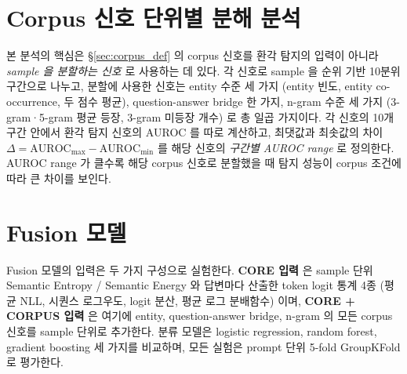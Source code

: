 \section{Corpus 신호 단위별 분해 분석}\label{sec:axis_framework}

본 분석의 핵심은 §\ref{sec:corpus_def} 의 corpus 신호를 환각 탐지의 입력이 아니라 \emph{sample 을 분할하는 신호} 로 사용하는 데 있다. 각 신호로 sample 을 순위 기반 10분위 구간으로 나누고, 분할에 사용한 신호는 entity 수준 세 가지 (entity 빈도, entity co-occurrence, 두 점수 평균), question-answer bridge 한 가지, n-gram 수준 세 가지 (3-gram·5-gram 평균 등장, 3-gram 미등장 개수) 로 총 일곱 가지이다. 각 신호의 10개 구간 안에서 환각 탐지 신호의 AUROC 를 따로 계산하고, 최댓값과 최솟값의 차이 $\Delta = \mathrm{AUROC}_{\max} - \mathrm{AUROC}_{\min}$ 를 해당 신호의 \emph{구간별 AUROC range} 로 정의한다. AUROC range 가 클수록 해당 corpus 신호로 분할했을 때 탐지 성능이 corpus 조건에 따라 큰 차이를 보인다.

\section{Fusion 모델}\label{sec:fusion_def}

Fusion 모델의 입력은 두 가지 구성으로 실험한다. \textbf{CORE 입력} 은 sample 단위 Semantic Entropy / Semantic Energy 와 답변마다 산출한 token logit 통계 4종 (평균 NLL, 시퀀스 로그우도, logit 분산, 평균 로그 분배함수) 이며, \textbf{CORE + CORPUS 입력} 은 여기에 entity, question-answer bridge, n-gram 의 모든 corpus 신호를 sample 단위로 추가한다. 분류 모델은 logistic regression, random forest, gradient boosting 세 가지를 비교하며, 모든 실험은 prompt 단위 5-fold GroupKFold 로 평가한다.
